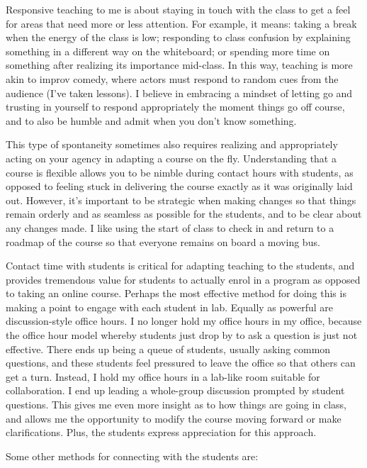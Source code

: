 \documentclass[]{article}
\begin{document}
Responsive teaching to me is about staying in touch with the class to get a feel for areas that need more or less attention. For example, it means: taking a break when the energy of the class is low; responding to class confusion by explaining something in a different way on the whiteboard; or spending more time on something after realizing its importance mid-class. In this way, teaching is more akin to improv comedy, where actors must respond to random cues from the audience (I've taken lessons). I believe in embracing a mindset of letting go and trusting in yourself to respond appropriately the moment things go off course, and to also be humble and admit when you don't know something.

This type of spontaneity sometimes also requires realizing and appropriately acting on your agency in adapting a course on the fly. Understanding that a course is flexible allows you to be nimble during contact hours with students, as opposed to feeling stuck in delivering the course exactly as it was originally laid out. However, it's important to be strategic when making changes so that things remain orderly and as seamless as possible for the students, and to be clear about any changes made. I like using the start of class to check in and return to a roadmap of the course so that everyone remains on board a moving bus.

Contact time with students is critical for adapting teaching to the students, and provides tremendous value for students to actually enrol in a program as opposed to taking an online course. Perhaps the most effective method for doing this is making a point to engage with each student in lab. Equally as powerful are discussion-style office hours. I no longer hold my office hours in my office, because the office hour model whereby students just drop by to ask a question is just not effective. There ends up being a queue of students, usually asking common questions, and these students feel pressured to leave the office so that others can get a turn. Instead, I hold my office hours in a lab-like room suitable for collaboration. I end up leading a whole-group discussion prompted by student questions. This gives me even more insight as to how things are going in class, and allows me the opportunity to modify the course moving forward or make clarifications. Plus, the students express appreciation for this approach.

Some other methods for connecting with the students are:
\end{document}
